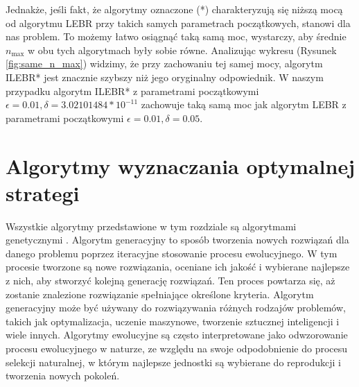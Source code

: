 \documentclass[inzynierska]{pwr_wmat_praca_dyplomowa}
\theoremstyle{plain}
\numberwithin{theorem}{chapter}
\theoremstyle{definition}
\numberwithin{theorem}{chapter}
\newcommand{\nmax}{n_{\text{max}}}
\begin{document}
	
	Jednakże, jeśli fakt, że algorytmy oznaczone (*) charakteryzują się niższą mocą od algorytmu LEBR przy takich samych parametrach początkowych, stanowi dla nas problem. 
	To możemy łatwo osiągnąć taką samą moc, wystarczy, aby średnie $\nmax$ w obu tych algorytmach były sobie równe.
	Analizując wykresu (Rysunek \ref{fig:same_n_max}) widzimy, że przy zachowaniu tej samej mocy, algorytm ILEBR* jest znacznie szybszy niż jego oryginalny odpowiednik. W naszym przypadku algorytm ILEBR* z parametrami początkowymi $\epsilon =0.01, \delta =3.02101484*10^{-11}$ zachowuje taką samą moc jak algorytm LEBR z parametrami początkowymi $\epsilon=0.01, \delta=0.05$.

	
	
	\section{Algorytmy wyznaczania optymalnej strategi}
	Wszystkie algorytmy przedstawione w tym rozdziale są algorytmami genetycznymi \cite{Figielska2006}. 
	Algorytm generacyjny to sposób tworzenia nowych rozwiązań dla danego problemu poprzez iteracyjne stosowanie procesu ewolucyjnego. W tym procesie tworzone są nowe rozwiązania, oceniane ich jakość i wybierane najlepsze z nich, aby stworzyć kolejną generację rozwiązań. Ten proces powtarza się, aż zostanie znalezione rozwiązanie spełniające określone kryteria. Algorytm generacyjny może być używany do rozwiązywania różnych rodzajów problemów, takich jak optymalizacja, uczenie maszynowe, tworzenie sztucznej inteligencji i wiele innych. Algorytmy ewolucyjne są często interpretowane jako odwzorowanie procesu ewolucyjnego w naturze, ze względu na swoje odpodobnienie do procesu selekcji naturalnej, w którym najlepsze jednostki są wybierane do reprodukcji i tworzenia nowych pokoleń.
	
\end{document}
